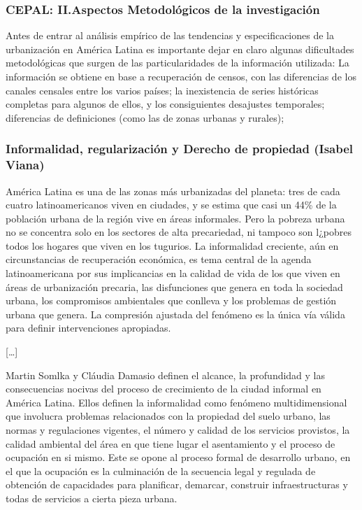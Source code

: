 \subsubsection*{CEPAL: II.\@ Aspectos Metodológicos de la investigación}
  Antes de entrar al análisis empírico de las tendencias y especificaciones de la urbanización en
  América Latina es importante dejar en claro algunas dificultades metodológicas que surgen de las
  particularidades de la información utilizada: La información se obtiene en base a recuperación de
  censos, con las diferencias de los canales censales entre los varios países; la inexistencia de
  series históricas completas para algunos de ellos, y los consiguientes desajustes temporales;
  diferencias de definiciones (como las de zonas urbanas y rurales); 

  \subsubsection*{Informalidad, regularización y Derecho de propiedad (Isabel Viana)}  
  América Latina es una de las zonas más urbanizadas del planeta: tres de cada cuatro latinoamericanos
  viven en ciudades, y se estima que casi un 44\% de la población urbana de la región vive en áreas
  informales. Pero la pobreza urbana no se concentra solo en los sectores de alta precariedad, ni
  tampoco son l¿pobres todos los hogares que viven en los tugurios. La informalidad creciente, aún en
  circunstancias de recuperación económica, es tema central de la agenda latinoamericana por sus
  implicancias en la calidad de vida de los que viven en áreas de urbanización precaria, las
  disfunciones que genera en toda la sociedad urbana, los compromisos ambientales que conlleva y los
  problemas de gestión urbana que genera. La compresión ajustada del fenómeno es la única vía válida
  para definir intervenciones apropiadas.

  [\ldots]

  Martin Somlka y Cláudia Damasio definen el alcance, la profundidad y las consecuencias
  nocivas del proceso de crecimiento de la ciudad informal en América Latina. Ellos definen la
  informalidad como fenómeno multidimensional que involucra problemas relacionados con la propiedad
  del suelo urbano, las normas y regulaciones vigentes, el número y calidad de los servicios
  provistos, la calidad ambiental del área en que tiene lugar el asentamiento y el proceso de
  ocupación en si mismo. Este se opone al proceso formal de desarrollo urbano, en el que la ocupación
  es la culminación de la secuencia legal y regulada de obtención de capacidades para planificar,
  demarcar, construir infraestructuras y todas de servicios a cierta pieza urbana.

